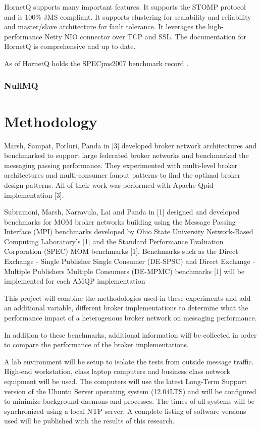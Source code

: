 \documentclass{thesis}
\begin{document}
HornetQ supports many important features.  It supports the STOMP  protocol and is 100\% JMS compliant.  It supports clustering for scalability and reliability and master/slave architecture for fault tolerance.  It leverages the high-performance Netty NIO connector over TCP and SSL.  The documentation for HornetQ is comprehensive and up to date.  

As of  HornetQ holds the SPECjms2007 benchmark record .  



\subsection{NullMQ}

\chapter{Methodology}
Marsh, Sampat, Potluri, Panda in [3] developed broker network architectures and benchmarked to support large federated broker networks and benchmarked the messaging passing performance.  They experimented with multi-level broker architectures and multi-consumer fanout patterns to find the optimal broker design patterns.  All of their work was performed with Apache Qpid implementation [3].  

Subramoni, Marsh, Narravula, Lai and Panda in [1] designed and developed benchmarks for MOM broker networks building using the Message Passing Interface (MPI) benchmarks developed by Ohio State University Network-Based Computing Laboratory’s [1] and the Standard Performance Evaluation Corporation (SPEC) MOM benchmarks  [1].  Benchmarks such as the Direct Exchange - Single Publisher Single Consumer (DE-SPSC) and Direct Exchange - Multiple Publishers Multiple Consumers (DE-MPMC) benchmarks [1] will be implemented for each AMQP implementation 

This project will combine the methodologies used in these experiments and add an additional variable, different broker implementations to determine what the performance impact of a heterogenous broker network on messaging performance.

In addition to these benchmarks, additional information will be collected in order to compare the performance of the broker implementations.

A lab environment will be setup to isolate the tests from outside message traffic.  High-end workstation, class laptop computers and business class network equipment will be used.  The computers will use the latest Long-Term Support version of the Ubuntu Server operating system (12.04LTS) and will be configured to minimize background daemons and processes.  The times of all systems will be synchronized using a local NTP server. A complete listing of software versions used will be published with the results of this research.
\end{document}
